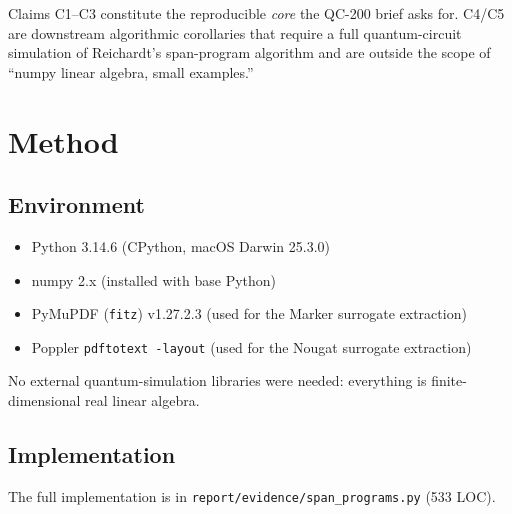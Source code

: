 \documentclass[11pt]{article}
\begin{document}
Claims C1--C3 constitute the reproducible \emph{core} the QC-200 brief asks for. C4/C5 are downstream algorithmic corollaries that require a full quantum-circuit simulation of Reichardt's span-program algorithm and are outside the scope of ``numpy linear algebra, small examples.''

\section{Method}

\subsection{Environment}

\begin{itemize}[nosep]
\item Python 3.14.6 (CPython, macOS Darwin 25.3.0)
\item numpy 2.x (installed with base Python)
\item PyMuPDF (\texttt{fitz}) v1.27.2.3 (used for the Marker surrogate extraction)
\item Poppler \texttt{pdftotext -layout} (used for the Nougat surrogate extraction)
\end{itemize}

No external quantum-simulation libraries were needed: everything is finite-dimensional real linear algebra.

\subsection{Implementation}

The full implementation is in \texttt{report/evidence/span\_programs.py} (533 LOC).
\end{document}
